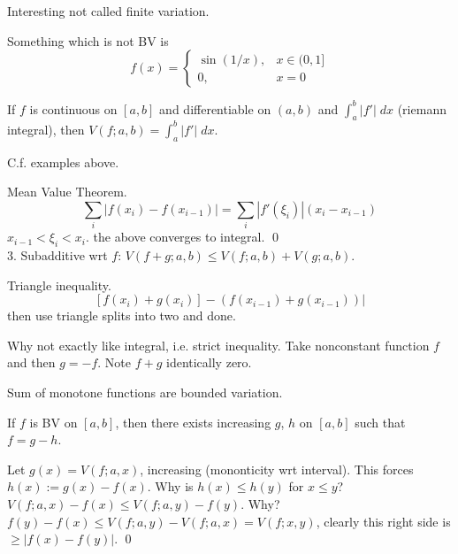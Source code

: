Interesting not called finite variation. 


Something which is not BV is 
	\[
	f(x)=
	\begin{cases}
	\sin(1/x), & x \in (0,1] \\
	0, & x=0
	\end{cases}
	\]



\begin{thm}
If $f$ is continuous on $[a,b]$ and differentiable on $(a,b)$ and $\int_a^b |f'| \; dx$ (riemann integral), then $V(f;a,b)= \int_a^b |f'| \; dx$.
\end{thm}

C.f. examples above. 


\pf Mean Value Theorem. 
	\[
	\sum_i |f(x_i) - f(x_{i-1})| = \sum_i |f'(\xi_i)| (x_i-x_{i-1})
	\]
$x_{i-1}< \xi_i < x_i$. the above converges to integral. \qed \\

3. Subadditive wrt $f$:
$V(f+g; a,b) \leq V(f; a,b) + V(g; a,b)$. 

\pf Triangle inequality.
	\[
	[f(x_i) + g(x_i)] - (f(x_{i-1}) + g(x_{i-1})) |
	\]
then use triangle splits into two and done. 

Why not exactly like integral, i.e. strict inequality. Take nonconstant function $f$ and then $g= -f$. Note $f+g$ identically zero. 




Sum of monotone functions are bounded variation. 



\begin{thm}[BV Decomposition]
If $f$ is BV on $[a,b]$, then there exists increasing $g$, $h$ on $[a,b]$ such that $f= g-h$. 
\end{thm}

\pf Let $g(x)= V(f; a,x)$, increasing (mononticity wrt interval). This forces $h(x):= g(x) - f(x)$. Why is $h(x) \leq h(y)$ for $x \leq y$? $V(f;a,x) - f(x) \leq V(f; a,y) - f(y)$. Why? $f(y)-f(x) \leq V(f; a,y) - V(f; a,x)= V(f;x,y)$, clearly this right side is $ \geq |f(x)-f(y)|$. \qed \\






























